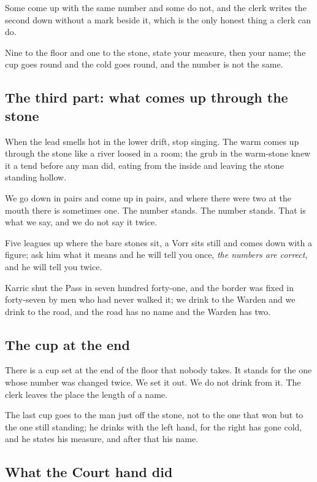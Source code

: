 \documentclass{design/chronicle}
\begin{document}
Some come up with the same number and some do not, and the clerk writes the second down without a mark beside it, which is the only honest thing a clerk can do.

Nine to the floor and one to the stone, state your measure, then your name; the cup goes round and the cold goes round, and the number is not the same.

\subsection*{The third part: what comes up through the stone}

When the lead smells hot in the lower drift, stop singing. The warm comes up through the stone like a river loosed in a room; the grub in the warm-stone knew it a tend before any man did, eating from the inside and leaving the stone standing hollow.

We go down in pairs and come up in pairs, and where there were two at the mouth there is sometimes one. The number stands. The number stands. That is what we say, and we do not say it twice.

Five leagues up where the bare stones sit, a Vorr sits still and comes down with a figure; ask him what it means and he will tell you once, \emph{the numbers are correct}, and he will tell you twice.

Karric shut the Pass in seven hundred forty-one, and the border was fixed in forty-seven by men who had never walked it; we drink to the Warden and we drink to the road, and the road has no name and the Warden has two.

\subsection*{The cup at the end}

There is a cup set at the end of the floor that nobody takes. It stands for the one whose number was changed twice. We set it out. We do not drink from it. The clerk leaves the place the length of a name.

The last cup goes to the man just off the stone, not to the one that won but to the one still standing; he drinks with the left hand, for the right has gone cold, and he states his measure, and after that his name.

\subsection*{What the Court hand did}
\end{document}
